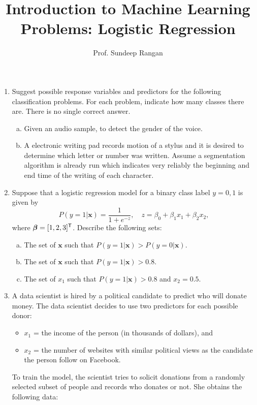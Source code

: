 \documentclass[11pt]{article}
\newcommand{\xbf}{\mathbf{x}}
\def\betabf{{\boldsymbol \beta}}
\newcommand{\tran}{^{\text{\sf T}}}
\begin{document}
\title{Introduction to Machine Learning\\
Problems:  Logistic Regression}
\author{Prof. Sundeep Rangan}
\date{}

\maketitle

\begin{enumerate}

\item Suggest possible response variables and predictors for the following classification
problems.  For each problem, indicate how many classes there are.  There is no single
correct answer.
\begin{enumerate}[(a)]
\item Given an audio sample, to detect the gender of the voice.
\item A electronic writing pad records motion of a stylus
and it is desired to determine
which letter or number was written.  Assume a segmentation algorithm is already run
which indicates very reliably the beginning and end time of the writing
of each character.
\end{enumerate}

\item Suppose that a logistic regression model for a binary class
label $y=0,1$ is given by
\[
    P(y=1|\xbf) = \frac{1}{1+e^{-z}}, \quad z = \beta_0 + \beta_1x_1 + \beta_2 x_2,
\]
where $\betabf = [1,2,3]\tran$.  Describe the following sets:
\begin{enumerate}[(a)]
\item The set of $\xbf$ such that $P(y=1|\xbf) > P(y=0|\xbf)$.
\item The set of $\xbf$ such that $P(y=1|\xbf) > 0.8$.
\item The set of $x_1$ such that $P(y=1|\xbf) > 0.8$ and $x_2=0.5$.
\end{enumerate}

\item A data scientist is hired by a
political candidate to predict who will donate
money.  The data scientist decides to use two predictors for each possible donor:
\begin{itemize}
\item $x_1$ = the income of the person (in thousands of dollars), and
\item $x_2$ = the number of websites with similar political views as the
candidate the person follow on Facebook.
\end{itemize}
To train the model, the scientist
tries to solicit donations from a randomly selected subset
of people and records who donates or not.  She obtains the following data:


\end{enumerate}
\end{document}
